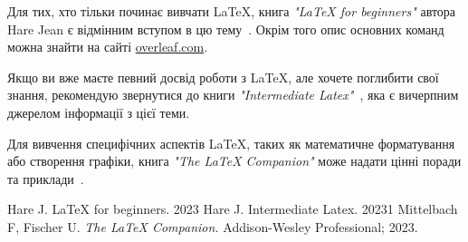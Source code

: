 \documentclass[14pt,a4paper,twoside]{article}
\begin{document}
	Для тих, хто тільки починає вивчати LaTeX, книга \textit{"LaTeX for beginners"} автора Hare Jean є відмінним вступом в цю тему~\cite{latexbegin}. Окрім того опис основних команд можна знайти на сайті \href{https://www.overleaf.com/learn}{overleaf.com}.
	
	Якщо ви вже маєте певний досвід роботи з LaTeX, але хочете поглибити свої знання, рекомендую звернутися до книги \textit{"Intermediate Latex"}~\cite{latexintermid}, яка є вичерпним джерелом інформації з цієї теми.
	
	Для вивчення специфічних аспектів LaTeX, таких як математичне форматування або створення графіки, книга \textit{"The LaTeX Companion"} може надати цінні поради та приклади~\cite{latexguide}.
	
	\newpage
	
	\begin{thebibliography}{9}
			Hare J. LaTeX for beginners. 2023
		 	Hare J. Intermediate Latex. 20231
		  Mittelbach F, Fischer U. 
		\textit{The LaTeX Companion.}  
		Addison-Wesley Professional; 2023.

	\end{thebibliography}
	\newpage
	\appendix
	
\end{document}
